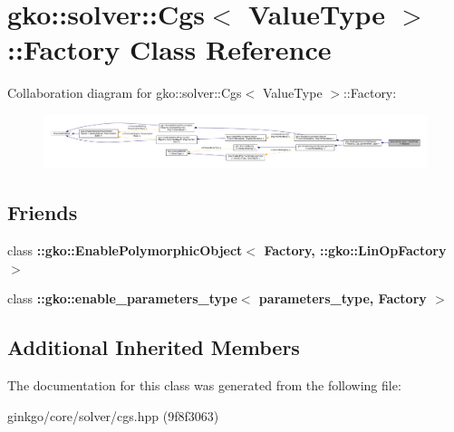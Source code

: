 \hypertarget{classgko_1_1solver_1_1Cgs_1_1Factory}{}\section{gko\+:\+:solver\+:\+:Cgs$<$ Value\+Type $>$\+:\+:Factory Class Reference}
\label{classgko_1_1solver_1_1Cgs_1_1Factory}


Collaboration diagram for gko\+:\+:solver\+:\+:Cgs$<$ Value\+Type $>$\+:\+:Factory\+:
\nopagebreak
\begin{figure}[H]
\begin{center}
\leavevmode
\includegraphics[width=350pt]{classgko_1_1solver_1_1Cgs_1_1Factory__coll__graph}
\end{center}
\end{figure}
\subsection*{Friends}
\begin{DoxyCompactItemize}
\item 
\mbox{\label{classgko_1_1solver_1_1Cgs_1_1Factory_a27e9bbc94a1c1c59f40833153eda8f78}} 
class {\bfseries \+::gko\+::\+Enable\+Polymorphic\+Object$<$ Factory, \+::gko\+::\+Lin\+Op\+Factory $>$}
\item 
\mbox{\label{classgko_1_1solver_1_1Cgs_1_1Factory_a0d176cbd42d6214e11aee8c30ca256fc}} 
class {\bfseries \+::gko\+::enable\+\_\+parameters\+\_\+type$<$ parameters\+\_\+type, Factory $>$}
\end{DoxyCompactItemize}
\subsection*{Additional Inherited Members}


The documentation for this class was generated from the following file\+:\begin{DoxyCompactItemize}
\item 
ginkgo/core/solver/cgs.\+hpp (9f8f3063)\end{DoxyCompactItemize}
